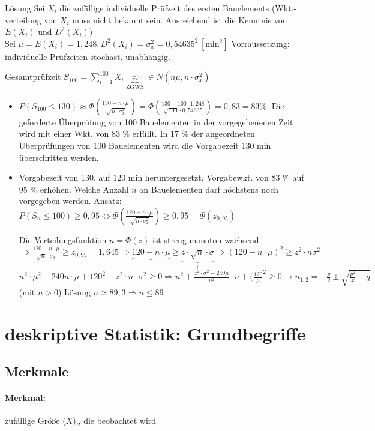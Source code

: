 \documentclass[a4paper]{scrartcl}
\begin{document}
Lösung Sei $X_i$ die zufällige individuelle Prüfzeit des ersten Bauelements (Wkt.-verteilung von $X_i$ muss nicht bekannt sein. Ausreichend ist die Kenntnis von $E(X_i)$ und $D^2(X_i)$)\\
Sei $\mu = E(X_i)= 1,248, D^2 (X_i) = \sigma_x^2 = 0,54635^2 \, [ \text{min}^2 ]$
Vorraussetzung: individuelle Prüfzeiten stochast. unabhängig.

Gesamtprüfzeit $S_{100} = \sum\limits_{i=1}^{100} X_i \underbrace{\approx}_{\text{ZGWS}} \in N(n \mu, n \cdot \sigma_x^2)$

\begin{itemize}
\item $P(S_{100} \leq 130) \approx \Phi (\frac{130-n\cdot \mu}{\sqrt{n \cdot \sigma_x^2}}) = \Phi (\frac{130 - 100 \cdot 1,248}{\sqrt{100} \cdot 0,54635}) = 0,83 = 83 \%$. Die geforderte Überprüfung von 100 Bauelementen in der vorgegebenenen Zeit wird mit einer Wkt. von 83 \% erfüllt. In 17 \% der angeordneten Überprüfungen von 100 Bauelementen wird die Vorgabezeit 130 min überschritten werden.
\item Vorgabezeit von 130, auf 120 min heruntergesetzt, Vorgabewkt. von 83 \% auf 95 \% erhöhen. Welche Anzahl $n$ an Bauelementen darf höchstens noch vorgegeben werden. Ansatz:
$P(S_n \leq 100) \geq 0,95 \Leftrightarrow \Phi (\frac{120 - n \cdot \mu}{\sqrt{n \cdot \sigma_x^2}}) \geq 0,95 = \Phi (z_{0,95})$

Die Verteilungsfunktion $n= \Phi (z)$ ist streng monoton wachsend $\Rightarrow \frac{120- n \cdot \mu}{\sqrt{n} \cdot \sigma_x} \geq z_{0,95} = 1,645 \Rightarrow \underbrace{120 - n \cdot \mu}_{+} \geq \underbrace{z \cdot \sqrt{n} \cdot \sigma}_{+} \Rightarrow (120-n \cdot \mu )^2 \geq z^2 \cdot n \sigma^2$\\
$n^2 \cdot \mu^2 - 240 n \cdot \mu + 120^2 -z^2 \cdot n \cdot \sigma^2 \geq 0 \Rightarrow n^2 + \frac{z^2 \cdot \sigma^2 - 240 \mu}{\mu^2} \cdot n + (\frac{120}{\mu}^2 \geq 0 \rightarrow n_{1,2} = - \frac{p}{2} \pm \sqrt{\frac{p^2}{x} - q}$ (mit $n > 0$) Lösung $n \approx 89,3 \Rightarrow n \leq 89$
\end{itemize}


\section{deskriptive Statistik: Grundbegriffe}
\subsection{Merkmale}
\paragraph{Merkmal:} zufällige Größe ($X$),, die beobachtet wird
\end{document}
